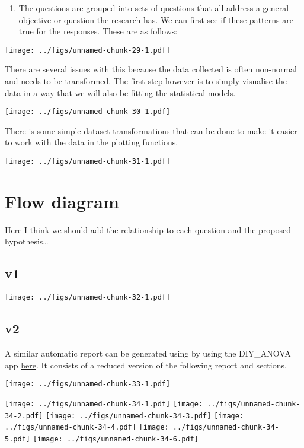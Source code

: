 \documentclass[]{book}
\providecommand{\tightlist}{%
  \setlength{\itemsep}{0pt}\setlength{\parskip}{0pt}}
\begin{document}
\begin{enumerate}
\def\labelenumi{\arabic{enumi}.}
\tightlist
\item
  The questions are grouped into sets of questions that all address a general objective or question the research has. We can first see if these patterns are true for the responses. These are as follows:
\end{enumerate}

\texttt{[image: ../figs/unnamed-chunk-29-1.pdf]}

There are several issues with this because the data collected is often non-normal and needs to be transformed. The first step however is to simply visualise the data in a way that we will also be fitting the statistical models.

\texttt{[image: ../figs/unnamed-chunk-30-1.pdf]}

There is some simple dataset transformations that can be done to make it easier to work with the data in the plotting functions.

\texttt{[image: ../figs/unnamed-chunk-31-1.pdf]}

\hypertarget{flow-diagram}{%
\section{Flow diagram}\label{flow-diagram}}

Here I think we should add the relationship to each question and the proposed hypothesis\ldots{}

\hypertarget{v1-1}{%
\subsection{v1}\label{v1-1}}

\texttt{[image: ../figs/unnamed-chunk-32-1.pdf]}

\hypertarget{v2-1}{%
\subsection{v2}\label{v2-1}}

A similar automatic report can be generated using by using the DIY\_ANOVA app \href{https://pecostats.shinyapps.io/DIY_ANOVA/}{here}. It consists of a reduced version of the following report and sections.

\texttt{[image: ../figs/unnamed-chunk-33-1.pdf]}

\texttt{[image: ../figs/unnamed-chunk-34-1.pdf]} \texttt{[image: ../figs/unnamed-chunk-34-2.pdf]} \texttt{[image: ../figs/unnamed-chunk-34-3.pdf]} \texttt{[image: ../figs/unnamed-chunk-34-4.pdf]} \texttt{[image: ../figs/unnamed-chunk-34-5.pdf]} \texttt{[image: ../figs/unnamed-chunk-34-6.pdf]}
\end{document}
